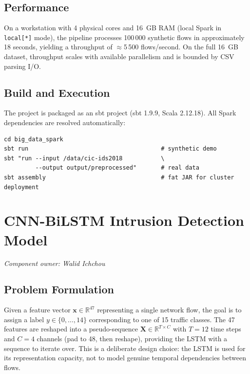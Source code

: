 \documentclass[12pt]{article}
\theoremstyle{plain}
\begin{document}
\subsection{Performance}

On a workstation with 4 physical cores and 16~GB RAM (local Spark in \texttt{local[*]} mode), the pipeline processes 100\,000 synthetic flows in approximately 18 seconds, yielding a throughput of $\approx$5\,500 flows/second. On the full 16~GB dataset, throughput scales with available parallelism and is bounded by CSV parsing I/O.

\subsection{Build and Execution}

The project is packaged as an sbt project (sbt 1.9.9, Scala 2.12.18). All Spark dependencies are resolved automatically:

\begin{verbatim}
cd big_data_spark
sbt run                                      # synthetic demo
sbt "run --input /data/cic-ids2018           \
         --output output/preprocessed"       # real data
sbt assembly                                 # fat JAR for cluster deployment
\end{verbatim}

\newpage
\section{CNN-BiLSTM Intrusion Detection Model}
\label{sec:model}
\textit{Component owner: Walid Ichchou}

\subsection{Problem Formulation}

Given a feature vector $\mathbf{x} \in \mathbb{R}^{47}$ representing a single network flow, the goal is to assign a label $y \in \{0, \ldots, 14\}$ corresponding to one of 15 traffic classes. The 47 features are reshaped into a pseudo-sequence $\mathbf{X} \in \mathbb{R}^{T \times C}$ with $T = 12$ time steps and $C = 4$ channels (pad to 48, then reshape), providing the LSTM with a sequence to iterate over. This is a deliberate design choice: the LSTM is used for its representation capacity, not to model genuine temporal dependencies between flows.
\end{document}
